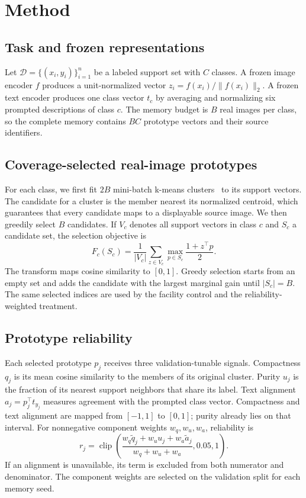 \documentclass[10pt,twocolumn]{article}
\begin{document}
\section{Method}
\label{sec:method}

\subsection{Task and frozen representations}

Let $\mathcal{D}=\{(x_i,y_i)\}_{i=1}^{n}$ be a labeled support set with $C$ classes.
A frozen image encoder $f$ produces a unit-normalized vector
$z_i=f(x_i)/\lVert f(x_i)\rVert_2$. A frozen text encoder produces one class vector
$t_c$ by averaging and normalizing six prompted descriptions of class $c$. The memory
budget is $B$ real images per class, so the complete memory contains $BC$ prototype
vectors and their source identifiers.

\subsection{Coverage-selected real-image prototypes}

For each class, we first fit $2B$ mini-batch k-means clusters~\cite{sculley2010web} to
its support vectors. The
candidate for a cluster is the member nearest its normalized centroid, which guarantees
that every candidate maps to a displayable source image. We then greedily select $B$
candidates. If $V_c$ denotes all support vectors in class $c$ and $S_c$ a candidate set,
the selection objective is
\begin{equation}
F_c(S_c)=\frac{1}{|V_c|}\sum_{z\in V_c}\max_{p\in S_c}
\frac{1+z^\top p}{2}.
\label{eq:facility}
\end{equation}
The transform maps cosine similarity to $[0,1]$. Greedy selection starts from an empty
set and adds the candidate with the largest marginal gain until $|S_c|=B$. The same
selected indices are used by the facility control and the reliability-weighted
treatment.

\subsection{Prototype reliability}

Each selected prototype $p_j$ receives three validation-tunable signals. Compactness
$q_j$ is its mean cosine similarity to the members of its original cluster. Purity
$u_j$ is the fraction of its nearest support neighbors that share its label. Text
alignment $a_j=p_j^\top t_{y_j}$ measures agreement with the prompted class vector.
Compactness and text alignment are mapped from $[-1,1]$ to $[0,1]$; purity already lies
on that interval. For nonnegative component weights $w_q,w_u,w_a$, reliability is
\begin{equation}
r_j=\operatorname{clip}\!\left(
\frac{w_q\tilde q_j+w_u u_j+w_a\tilde a_j}{w_q+w_u+w_a},
0.05,1\right).
\label{eq:reliability}
\end{equation}
If an alignment is unavailable, its term is excluded from both numerator and
denominator. The component weights are selected on the validation split for each memory
seed.
\end{document}
